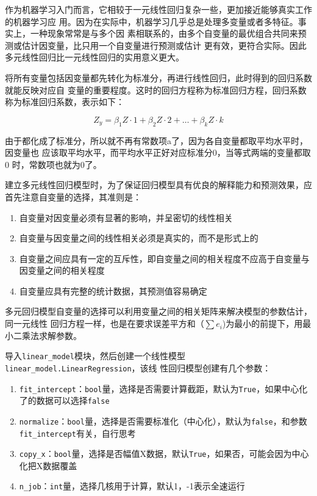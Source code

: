 \documentclass[11pt,a4paper]{elegantpaper}
\begin{document}
\begin{multicols}{2}
作为机器学习入门而言，它相较于一元线性回归复杂一些，更加接近能够真实工作的机器学习应
用。因为在实际中，机器学习几乎总是处理多变量或者多特征。事实上，一种现象常常是与多个因
素相联系的，由多个自变量的最优组合共同来预测或估计因变量，比只用一个自变量进行预测或估计
更有效，更符合实际。因此多元线性回归比一元线性回归的实用意义更大。

将所有变量包括因变量都先转化为标准分，再进行线性回归，此时得到的回归系数就能反映对应自
变量的重要程度。这时的回归方程称为标准回归方程，回归系数称为标准回归系数，表示如下：

$$
Z_{y}=\beta_{1} Z \cdot 1+\beta_{2} Z \cdot 2+\ldots+\beta_{k} Z \cdot k
$$

由于都化成了标准分，所以就不再有常数项a了，因为各自变量都取平均水平时，因变量也
应该取平均水平，而平均水平正好对应标准分0，当等式两端的变量都取 0 时，常数项也就为0了。

建立多元线性回归模型时，为了保证回归模型具有优良的解释能力和预测效果，应首先注意自变量的选择，其准则是：

\begin{enumerate}
  \item 自变量对因变量必须有显著的影响，并呈密切的线性相关
  \item 自变量与因变量之间的线性相关必须是真实的，而不是形式上的
  \item 自变量之间应具有一定的互斥性，即自变量之间的相关程度不应高于自变量与因变量之间的相关程度
  \item 自变量应具有完整的统计数据，其预测值容易确定
\end{enumerate}

多元回归模型自变量的选择可以利用变量之间的相关矩阵来解决模型的参数估计，同一元线性
回归方程一样，也是在要求误差平方和（$\sum e_i$)为最小的前提下，用最小二乘法求解参数。

导入\lstinline{linear_model}模块，然后创建一个线性模型\lstinline{linear_model.LinearRegression}，该线
性回归模型创建有几个参数：

\begin{enumerate}
  \item \lstinline{fit_intercept}：\lstinline{bool}量，选择是否需要计算截距，默认为\lstinline{True}，如果中心化了的数据可以选择\lstinline{false}
  \item \lstinline{normalize}：\lstinline{bool}量，选择是否需要标准化（中心化），默认为\lstinline{false}，和参数\lstinline{fit_intercept}有关，自行思考
  \item \lstinline{copy_x}：\lstinline{bool}量，选择是否幅值X数据，默认\lstinline{True}，如果否，可能会因为中心化把X数据覆盖
  \item \lstinline{n_job}：\lstinline{int}量，选择几核用于计算，默认1，-1表示全速运行
\end{enumerate}


\end{multicols}
\end{document}

